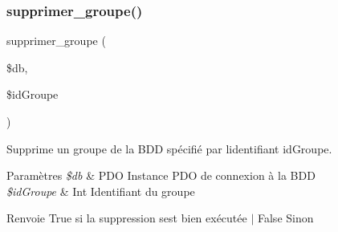 \subsubsection{\texorpdfstring{supprimer\+\_\+groupe()}{supprimer\_groupe()}}
{\footnotesize\ttfamily supprimer\+\_\+groupe (\begin{DoxyParamCaption}\item[{}]{\$db,  }\item[{}]{\$id\+Groupe }\end{DoxyParamCaption})}



Supprime un groupe de la B\+DD spécifié par l\textquotesingle{}identifiant \textquotesingle{}id\+Groupe\textquotesingle{}. 


\begin{DoxyParams}{Paramètres}
{\em \$db} & P\+DO Instance P\+DO de connexion à la B\+DD \\
\hline
{\em \$id\+Groupe} & Int Identifiant du groupe \\
\hline
\end{DoxyParams}
\begin{DoxyReturn}{Renvoie}
True si la suppression s\textquotesingle{}est bien exécutée $\vert$ False Sinon 
\end{DoxyReturn}
